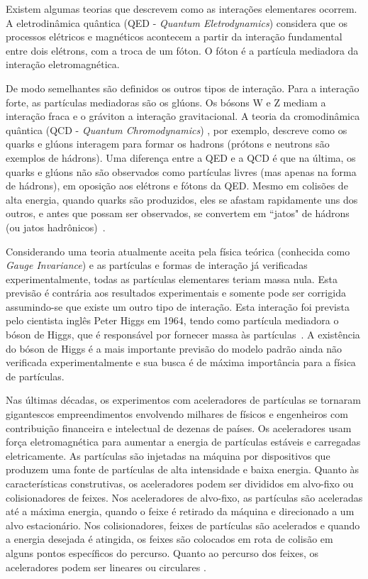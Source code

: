 Existem algumas teorias que descrevem como as interações elementares
ocorrem. A eletrodinâmica quântica (QED - \textit{Quantum
Eletrodynamics}) considera que os processos elétricos e magnéticos
acontecem a partir da interação fundamental entre dois elétrons, com
a troca de um fóton. O fóton é a partícula mediadora da interação
eletromagnética.

De modo semelhantes são definidos os outros tipos de interação. Para
a interação forte, as partículas mediadoras são os glúons. Os bósons
W e Z mediam a interação fraca e o gráviton a interação
gravitacional. A teoria da cromodinâmica quântica (QCD -
\textit{Quantum Chromodynamics}) \cite{book:QCD:2003}, por exemplo,
descreve como os quarks e glúons interagem para formar os hadrons
(prótons e neutrons são exem\-plos de hádrons). Uma diferença entre
a QED e a QCD é que na última, os quarks e glúons não são observados
como partículas livres (mas apenas na forma de hádrons), em oposição
aos elétrons e fótons da QED. Mesmo em colisões de alta energia,
quando quarks são produzidos, eles se afastam rapidamente uns dos
outros, e antes que possam ser observados, se convertem em ``jatos"
de hádrons (ou jatos hadrônicos)~\cite{book:martin:2006}.

Considerando uma teoria atualmente aceita pela física teórica
(conhecida como \textit{Gauge Invariance}) e as partículas e formas
de interação já verificadas experimentalmente, todas as partículas
elementares teriam massa nula. Esta previsão é contrária aos
resultados experimentais e somente pode ser corrigida assumindo-se
que existe um outro tipo de interação. Esta interação foi prevista
pelo cientista inglês Peter Higgs em 1964, tendo como partícula
mediadora o bóson de Higgs, que é responsável por fornecer massa às
partículas~\cite{book:martin:2006}. A existência do bóson de Higgs é
a mais importante previsão do modelo padrão ainda não verificada
experimentalmente e sua busca é de máxima importância para a física
de partículas.

Nas últimas décadas, os experimentos com aceleradores de partículas
se tornaram gigantescos empreendimentos envolvendo milhares de
físicos e engenheiros com contribuição financeira e intelectual de
dezenas de países. Os aceleradores usam força eletromagnética para
aumentar a energia de partículas estáveis e carregadas
eletricamente. As partículas são injetadas na máquina por
dispositivos que produzem uma fonte de partículas de alta
intensidade e baixa energia. Quanto às características construtivas,
os aceleradores podem ser divididos em alvo-fixo ou colisionadores
de feixes. Nos aceleradores de alvo-fixo, as partículas são
aceleradas até a máxima energia, quando o feixe é retirado da
máquina e direcionado a um alvo estacionário. Nos colisionadores,
feixes de partículas são acelerados e quando a energia desejada é
atingida, os feixes são colocados em rota de colisão em alguns
pontos específicos do percurso. Quanto ao percurso dos feixes, os
aceleradores podem ser lineares ou circulares \cite{book:martin:2006}.

